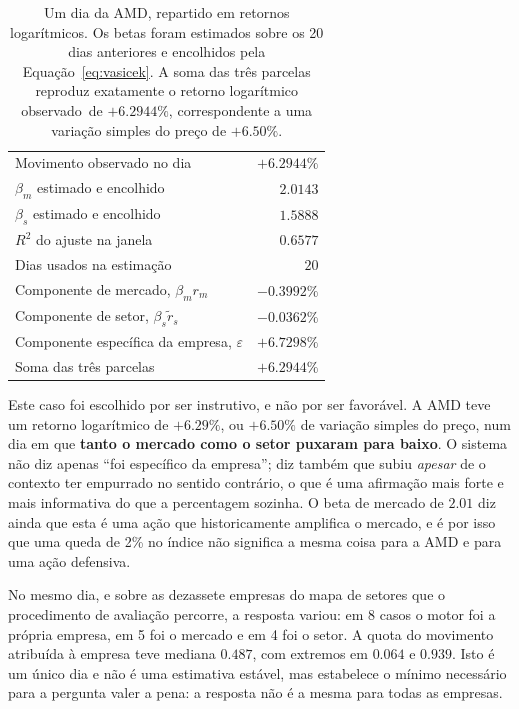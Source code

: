 \begin{table}[ht]
\caption[A decomposição de um movimento real]{Um dia da AMD, repartido em retornos logarítmicos.
Os betas foram estimados sobre os 20 dias anteriores e encolhidos pela
Equação~\ref{eq:vasicek}. A soma das três parcelas reproduz exatamente o retorno logarítmico
observado~de $+6.2944\%$, correspondente a uma variação simples do preço de $+6.50\%$.}
\label{tab:met_decomposicao}
\centering
\small
\begin{tabular}{L{0.42\textwidth} r}
\toprule
{} &  \\
\midrule
Movimento observado no dia & $+6.2944\%$ \\
\midrule
$\beta_m$ estimado e encolhido & $2.0143$ \\
$\beta_s$ estimado e encolhido & $1.5888$ \\
$R^2$ do ajuste na janela & $0.6577$ \\
Dias usados na estimação & $20$ \\
\midrule
Componente de mercado, $\beta_m r_m$ & $-0.3992\%$ \\
Componente de setor, $\beta_s \tilde r_s$ & $-0.0362\%$ \\
Componente específica da empresa, $\varepsilon$ & $+6.7298\%$ \\
\midrule
Soma das três parcelas & $+6.2944\%$ \\
\bottomrule
\end{tabular}
\end{table}

Este caso foi escolhido por ser instrutivo, e não por ser favorável. A AMD teve um retorno
logarítmico de $+6.29\%$, ou $+6.50\%$ de variação simples do preço, num dia em que \textbf{tanto
o mercado como o setor puxaram para baixo}. O sistema não diz apenas ``foi
específico da empresa''; diz também que subiu \emph{apesar} de o contexto ter empurrado no sentido
contrário, o que é uma afirmação mais forte e mais informativa do que a percentagem sozinha. O beta
de mercado de $2.01$ diz ainda que esta é uma ação que historicamente amplifica o mercado, e é por
isso que uma queda de 2\% no índice não significa a mesma coisa para a AMD e para uma ação defensiva.

No mesmo dia, e sobre as dezassete empresas do mapa de setores que o procedimento de avaliação percorre, a resposta variou: em 8 casos o motor foi a própria
empresa, em 5 foi o mercado e em 4 foi o setor. A quota do movimento atribuída à empresa teve mediana
$0.487$, com extremos em $0.064$ e $0.939$. Isto é um único dia e não é uma estimativa estável, mas
estabelece o mínimo necessário para a pergunta valer a pena: a resposta não é a mesma para todas as
empresas.

